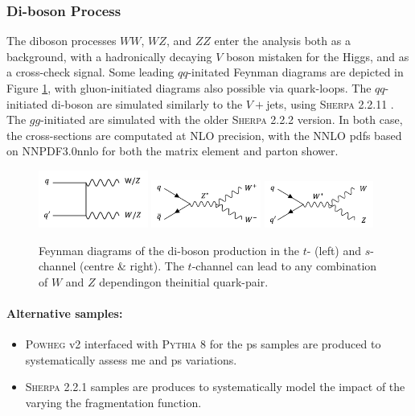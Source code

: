 \subsubsection{Di-boson Process}
The diboson processes $WW$, $WZ$, and $ZZ$ enter the analysis both as a background, with a hadronically decaying $V$ boson mistaken for the Higgs, and as a cross-check signal. Some leading $qq$-initated Feynman diagrams are depicted in Figure \ref{fig:feyndiV}, with gluon-initiated diagrams also possible via quark-loops. The $qq$-initiated di-boson are simulated similarly to the $V+$jets, using \textsc{Sherpa} 2.2.11 \cite{10.21468/SciPostPhys.7.3.034}. The $gg$-initiated are simulated with the older \textsc{Sherpa} 2.2.2 version. In both case, the cross-sections are computated at NLO precision, with the NNLO \gls{pdf}s based on NNPDF3.0nnlo \cite{PDFLHCrun2} for both the matrix element and parton shower.
\begin{figure}[h!]
  \center
  \includegraphics[width=0.32\textwidth]{Images/VH/Feynman/diboson.png}
  \includegraphics[width=0.32\textwidth]{Images/VH/Feynman/diW.png}
  \includegraphics[width=0.32\textwidth]{Images/VH/Feynman/diWZ.png}
  \caption{Feynman diagrams of the di-boson production in the $t$- (left) and $s$-channel (centre \& right). The $t$-channel can lead to any combination of $W$ and $Z$ dependingon theinitial quark-pair.}
  \label{fig:feyndiV}
\end{figure}

\paragraph{Alternative samples:}
\begin{itemize}
  \item \textsc{Powheg} v2 interfaced with \textsc{Pythia} 8 for the \gls{ps} samples are produced to systematically assess \gls{me} and \gls{ps} variations. 
  \item \textsc{Sherpa} 2.2.1 samples are produces to systematically model the impact of the varying the fragmentation function.
\end{itemize}

